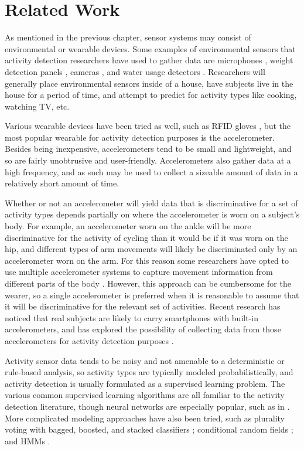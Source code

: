 \chapter{Related Work}
As mentioned in the previous chapter, sensor systems may consist
of environmental or wearable devices. Some examples of environmental
sensors that activity detection researchers have used to
gather data are microphones \cite{fogarty06}, weight detection
panels \cite{rowan05}, cameras \cite{duong05}, and water usage detectors
\cite{fogarty06}. Researchers will generally place environmental sensors
inside of a house, have subjects live in the house for a period of time, and
attempt to predict for activity types like cooking, watching TV, etc.

Various wearable devices have been tried as well, such as RFID gloves
\cite{gu09} \cite{rowan05}, but the most popular wearable for activity detection
purposes is the accelerometer. Besides being inexpensive, accelerometers
tend to be small and lightweight, and so are fairly unobtrusive and
user-friendly. Accelerometers also gather data at a high frequency, and as such
may be used to collect a sizeable amount of data in a relatively short amount
of time.

Whether or not an accelerometer will yield data that is discriminative for a
set of activity types depends partially on where the accelerometer is worn on
a subject's body. For example, an accelerometer worn on the ankle will be
more discriminative for the activity of cycling than it would be if it was worn
on the hip, and different types of arm movements will likely be
discriminated only by an accelerometer worn on the arm. For this reason some
researchers have opted to use multiple accelerometer systems to capture
movement information from different parts of the body \cite{bao04}
\cite{devries11}. However, this approach can be cumbersome for the wearer, so a
single accelerometer is preferred when it is reasonable to assume that it will
be discriminative for the relevant set of activities. Recent research has
noticed that real subjects are likely to carry smartphones with built-in
accelerometers, and has explored the possibility of collecting data from those
accelerometers for activity detection purposes \cite{bao04} \cite{choudhury08}
\cite{kwapitz10} \cite{rai12}.

Activity sensor data tends to be noisy and not amenable to a
deterministic or rule-based analysis, so activity types are typically modeled
probabilistically, and activity detection is usually formulated as a supervised
learning problem. The various common supervised learning algorithms are all
familiar to the activity detection literature, though neural networks are
especially popular, such as in \cite{aminian95} \cite{song07} \cite{staudenmeyer09}.
More complicated modeling approaches have also been tried, such as
plurality voting with bagged, boosted, and stacked classifiers \cite{ravi05};
conditional random fields \cite{blanke10} \cite{gu09} \cite{vankasteren08}
\cite{wu09}; and HMMs \cite{gu09} \cite{lester05} \cite{pober06} \cite{wu09}.

